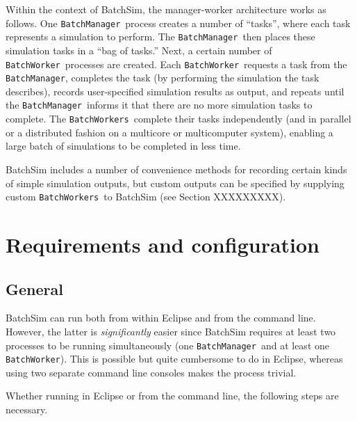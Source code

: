 \documentclass{article}
\newcommand{\BM}{{\tt BatchManager}}
\newcommand{\BW}{{\tt BatchWorker}}
\newcommand{\BWs}{{\tt BatchWorkers}}
\begin{document}
Within the context of BatchSim, the manager-worker architecture works as follows. One \BM\ process creates a number of ``tasks'', where each task represents a simulation to perform. The \BM\ then places these simulation tasks in a ``bag of tasks.'' Next, a certain number of \BW\ processes are created. Each \BW\ requests a task from the \BM, completes the task (by performing the simulation the task describes), records user-specified simulation results as output, and repeats until the \BM\ informs it that there are no more simulation tasks to complete. The \BWs\ complete their tasks independently (and in parallel or a distributed fashion on a multicore or multicomputer system), enabling a large batch of simulations to be completed in less time.
 
BatchSim includes a number of convenience methods for recording certain kinds of simple simulation outputs, but custom outputs can be specified by supplying custom \BWs\ to BatchSim (see Section XXXXXXXXX).

\section{Requirements and configuration}

\subsection{General}
\label{req:general}

BatchSim can run both from within Eclipse and from the command line. However, the latter is \textit{significantly} easier since BatchSim requires at least two processes to be running simultaneously (one \BM\ and at least one \BW). This is possible but quite cumbersome to do in Eclipse, whereas using two separate command line consoles makes the process trivial.

Whether running in Eclipse or from the command line, the following steps are necessary.
\end{document}
